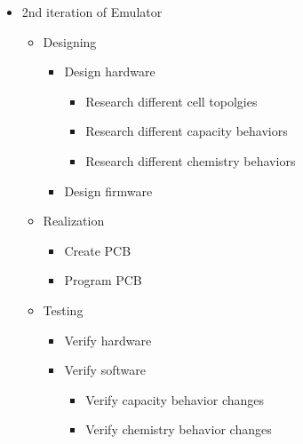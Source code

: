 \begin{itemize}
    \item 2nd iteration of Emulator
    \begin{itemize}
        \item Designing 
        \begin{itemize}
            \item Design hardware
            \begin{itemize}
                \item Research different cell topolgies 
                \item Research different capacity behaviors 
                \item Research different chemistry behaviors
            \end{itemize}
            \item Design firmware
        \end{itemize}
        \item Realization
        \begin{itemize}
        \item Create PCB
        \item Program PCB
        \end{itemize}
        \item Testing
        \begin{itemize}
            \item Verify hardware
            \item Verify software 
            \begin{itemize}
                \item Verify capacity behavior changes
                \item Verify chemistry behavior changes
            \end{itemize}
        \end{itemize}
    \end{itemize}
\end{itemize}
